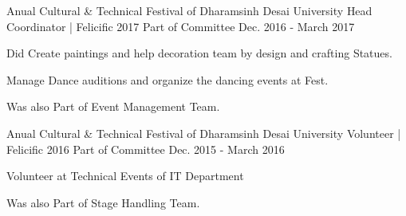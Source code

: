 \begin{cventries}
  \cventry
    {Anual Cultural \& Technical Festival of Dharamsinh Desai University}
    {Head Coordinator | Felicific 2017}
    {Part of Committee}
    {Dec. 2016 - March 2017}
    {
      \begin{cvitems}
        \item {Did Create paintings and help decoration team by design and crafting Statues.}
        \item {Manage Dance auditions and organize the dancing events at Fest.}
        \item {Was also Part of Event Management Team.}
      \end{cvitems}
    }
    \cventry
    {Anual Cultural \& Technical Festival of Dharamsinh Desai University}
    {Volunteer | Felicific 2016}
    {Part of Committee}
    {Dec. 2015 - March 2016}
    {
        \begin{cvitems}
        \item {Volunteer at Technical Events of IT Department}
        \item {Was also Part of Stage Handling Team.}
      \end{cvitems}
    }
\end{cventries}
